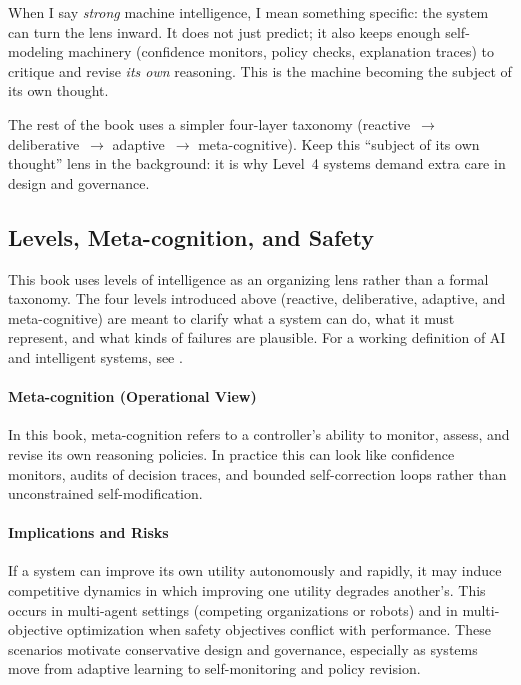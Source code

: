 \begin{tcolorbox}[perspectivebox, title={Author's note: ``subject of its own thought''}]
When I say \emph{strong} machine intelligence, I mean something specific: the system can turn the lens inward. It does not just predict; it also keeps enough self-modeling machinery (confidence monitors, policy checks, explanation traces) to critique and revise \emph{its own} reasoning. This is the machine becoming the subject of its own thought.

The rest of the book uses a simpler four-layer taxonomy (reactive~$\rightarrow$ deliberative~$\rightarrow$ adaptive~$\rightarrow$ meta-cognitive). Keep this ``subject of its own thought'' lens in the background: it is why Level~4 systems demand extra care in design and governance.
\end{tcolorbox}

\subsection{Levels, Meta-cognition, and Safety}\label{subsec:levels}

This book uses levels of intelligence as an organizing lens rather than a formal taxonomy. The four levels introduced above (reactive, deliberative, adaptive, and meta-cognitive) are meant to clarify what a system can do, what it must represent, and what kinds of failures are plausible. For a working definition of AI and intelligent systems, see .

\paragraph{Meta-cognition (Operational View)}

In this book, meta-cognition refers to a controller's ability to monitor, assess, and revise its own reasoning policies. In practice this can look like confidence monitors, audits of decision traces, and bounded self-correction loops rather than unconstrained self-modification.

\paragraph{Implications and Risks}

If a system can improve its own utility autonomously and rapidly, it may induce competitive dynamics in which improving one utility degrades another's. This occurs in multi-agent settings (competing organizations or robots) and in multi-objective optimization when safety objectives conflict with performance. These scenarios motivate conservative design and governance, especially as systems move from adaptive learning to self-monitoring and policy revision.


